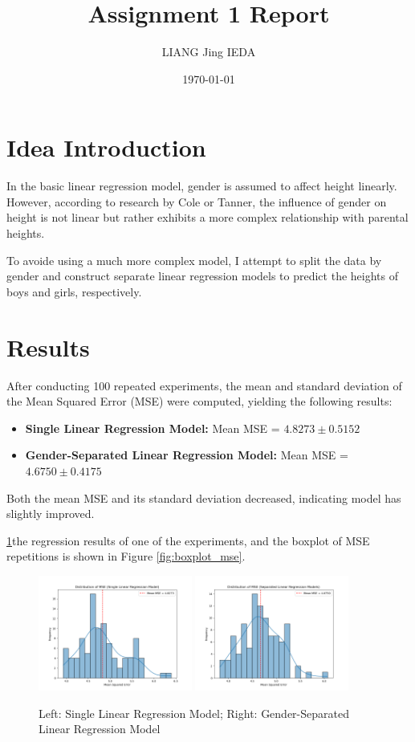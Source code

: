 \documentclass[12pt,a4paper]{article}
\title{Assignment 1 Report}
\author{LIANG Jing \quad IEDA}
\date{\today}
\begin{document}
\maketitle

\section{Idea Introduction}
In the basic linear regression model, gender is assumed to affect height linearly. However, according to research by Cole or Tanner, the influence of gender on height is not linear but rather exhibits a more complex relationship with parental heights.

To avoide using a much more complex model,
I attempt to split the data by gender and construct separate linear regression models to predict the heights of boys and girls, respectively.

\section{Results}
After conducting 100 repeated experiments, the mean and standard deviation of the Mean Squared Error (MSE) were computed, yielding the following results:

\begin{itemize}
\item \textbf{Single Linear Regression Model:} Mean MSE = $4.8273 \pm 0.5152$
\item \textbf{Gender-Separated Linear Regression Model:} Mean MSE = $4.6750 \pm 0.4175$
\end{itemize}
Both the mean MSE and its standard deviation decreased, indicating model has slightly improved.

\ref{fig:comparison}the regression results of one of the experiments, and the boxplot of MSE  repetitions is shown in Figure \ref{fig:boxplot_mse}.
\begin{figure}[ht]
    \centering
    \includegraphics[width=0.45\textwidth]{./fig/Figure_1.png}
    \includegraphics[width=0.45\textwidth]{./fig/Figure_2.png}
    \caption{Left: Single Linear Regression Model; Right: Gender-Separated Linear Regression Model}
    \label{fig:comparison}
\end{figure}
\end{document}
